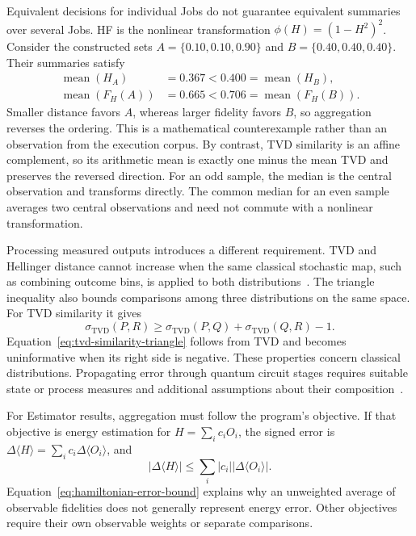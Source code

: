 \documentclass[10pt,conference]{IEEEtran}
\newcommand{\TVD}{\mathrm{TVD}}
\newcommand{\HF}{F_{H}}
\begin{document}
Equivalent decisions for individual Jobs do not guarantee equivalent summaries over several Jobs. HF is the nonlinear transformation $\phi(H)=(1-H^2)^2$. Consider the constructed sets $A=\{0.10,0.10,0.90\}$ and $B=\{0.40,0.40,0.40\}$. Their summaries satisfy
\begin{equation}
\begin{aligned}
\operatorname{mean}(H_A)&=0.367<0.400=\operatorname{mean}(H_B),\\
\operatorname{mean}(\HF(A))&=0.665<0.706=\operatorname{mean}(\HF(B)).
\end{aligned}
\label{eq:aggregation-reversal}
\end{equation}
Smaller distance favors $A$, whereas larger fidelity favors $B$, so aggregation reverses the ordering. This is a mathematical counterexample rather than an observation from the execution corpus. By contrast, TVD similarity is an affine complement, so its arithmetic mean is exactly one minus the mean TVD and preserves the reversed direction. For an odd sample, the median is the central observation and transforms directly. The common median for an even sample averages two central observations and need not commute with a nonlinear transformation.

Processing measured outputs introduces a different requirement. TVD and Hellinger distance cannot increase when the same classical stochastic map, such as combining outcome bins, is applied to both distributions~\cite{csiszar1967}. The triangle inequality also bounds comparisons among three distributions on the same space. For TVD similarity it gives
\begin{equation}
\sigma_{\TVD}(P,R)
\geq
\sigma_{\TVD}(P,Q)+\sigma_{\TVD}(Q,R)-1.
\label{eq:tvd-similarity-triangle}
\end{equation}
Equation~\ref{eq:tvd-similarity-triangle} follows from TVD and becomes uninformative when its right side is negative. These properties concern classical distributions. Propagating error through quantum circuit stages requires suitable state or process measures and additional assumptions about their composition~\cite{gilchrist2005}.

For Estimator results, aggregation must follow the program's objective. If that objective is energy estimation for $H=\sum_i c_iO_i$, the signed error is $\Delta\langle H\rangle=\sum_i c_i\Delta\langle O_i\rangle$, and
\begin{equation}
\left|\Delta\langle H\rangle\right|
\leq
\sum_i|c_i|\left|\Delta\langle O_i\rangle\right|.
\label{eq:hamiltonian-error-bound}
\end{equation}
Equation~\ref{eq:hamiltonian-error-bound} explains why an unweighted average of observable fidelities does not generally represent energy error. Other objectives require their own observable weights or separate comparisons.
\end{document}
